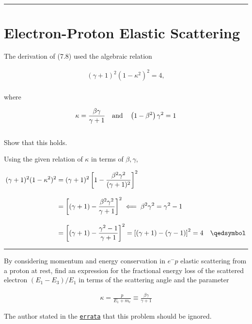 
\noindent\rule{7in}{2.8pt}
\section{Electron-Proton Elastic Scattering}
    
\begin{problem}{7.1}
The derivation of (7.8) used the algebraic relation

\begin{align*}
    \left(\gamma+1\right)^2 \left(1-\kappa^2\right)^2 = 4,
\end{align*}\\
where 

\begin{align*}
    \kappa = \frac{\beta\gamma}{\gamma+1} \quad \text{and} \quad \left(1-\beta^2\right)\gamma^2 = 1
\end{align*}\\
Show that this holds.
\end{problem}
\begin{solution}
Using the given relation of $\kappa$ in terms of $\beta,\gamma$,

\begin{align*}
    (\gamma+1)^2 (1-\kappa^2)^2 &= (\gamma+1)^2 \left[ 1- \frac{\beta^2\gamma^2}{(\gamma+1)^2} \right]^2 \\[0.12in]
                                &= \left[ (\gamma+1) - \frac{\beta^2\gamma^2}{\gamma+1} \right]^2 \impliedby \beta^2\gamma^2 = \gamma^2 - 1 \\[0.12in]
                                &= \left[ (\gamma+1) - \frac{\gamma^2-1}{\gamma+1} \right]^2 = \left[ (\gamma+1) - (\gamma-1) \right]^2 = 4 \qed
\end{align*}
\end{solution}

\noindent\rule{7in}{1.5pt}


\begin{problem}{7.2}
    By considering momentum and energy conservation in $e^-p$ elastic scattering from a proton at rest, find an expression for the fractional energy loss of the scattered electron $\left( E_1 - E_3 \right)/E_1$ in terms of the scattering angle and the parameter

    \begin{align*}
        \kappa = \frac{p}{E_1 +m_e} \equiv \frac{\beta\gamma}{\gamma+1}
    \end{align*}
\end{problem}
\begin{solution}
The author stated in the \href{https://www.hep.phy.cam.ac.uk/~thomson/MPP/ModernParticlePhysics_Errata.pdf}{\texttt{errata}} that this problem should be ignored. 
\end{solution}

